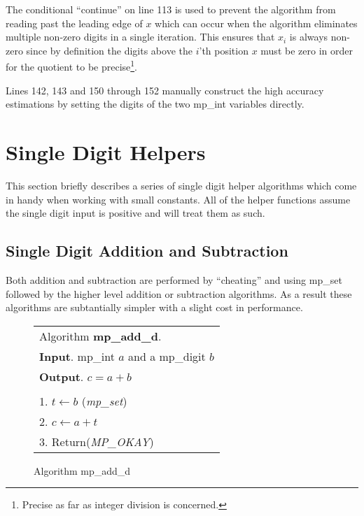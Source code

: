 \documentclass[b5paper]{book}
\begin{document}
The conditional ``continue'' on line 113 is used to prevent the algorithm from reading past the leading edge of $x$ which can occur when the
algorithm eliminates multiple non-zero digits in a single iteration.  This ensures that $x_i$ is always non-zero since by definition the digits
above the $i$'th position $x$ must be zero in order for the quotient to be precise\footnote{Precise as far as integer division is concerned.}.  

Lines 142, 143 and 150 through 152 manually construct the high accuracy estimations by setting the digits of the two mp\_int 
variables directly.  

\section{Single Digit Helpers}

This section briefly describes a series of single digit helper algorithms which come in handy when working with small constants.  All of 
the helper functions assume the single digit input is positive and will treat them as such.

\subsection{Single Digit Addition and Subtraction}

Both addition and subtraction are performed by ``cheating'' and using mp\_set followed by the higher level addition or subtraction 
algorithms.   As a result these algorithms are subtantially simpler with a slight cost in performance.

\newpage\begin{figure}[!here]
\begin{small}
\begin{center}
\begin{tabular}{l}
\hline Algorithm \textbf{mp\_add\_d}. \\
\textbf{Input}.   mp\_int $a$ and a mp\_digit $b$ \\
\textbf{Output}.  $c = a + b$ \\
\hline \\
1.  $t \leftarrow b$ (\textit{mp\_set}) \\
2.  $c \leftarrow a + t$ \\
3.  Return(\textit{MP\_OKAY}) \\
\hline
\end{tabular}
\end{center}
\end{small}
\caption{Algorithm mp\_add\_d}
\end{figure}
\end{document}
